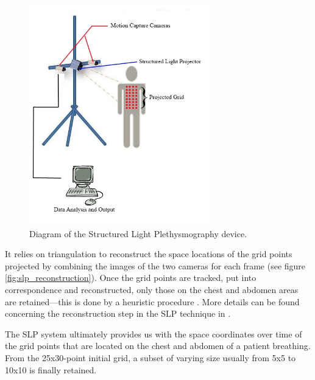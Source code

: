 \begin{figure}
	\centering
	 \includegraphics[width=0.7\textwidth]{pics/slp_device}
	\caption[Diagram of the Structured Light Plethysmography device]{\label{fig:slp_device}Diagram of the Structured Light Plethysmography device.}
\end{figure}

It relies on triangulation to reconstruct the space locations of the grid points projected by combining the images of the two cameras for each frame (see figure \ref{fig:slp_reconstruction}). Once the grid points are tracked, put into correspondence and reconstructed, only those on the chest and abdomen areas are retained---this is done by a heuristic procedure \cite{deboer2010breathing}. More details can be found concerning the reconstruction step in the SLP technique in \cite{stuart2011}.

The SLP system ultimately provides us with the space coordinates over time of the grid points that are located on the chest and abdomen of a patient breathing. From the 25x30-point initial grid, a subset of varying size usually from 5x5 to 10x10 is finally retained.

